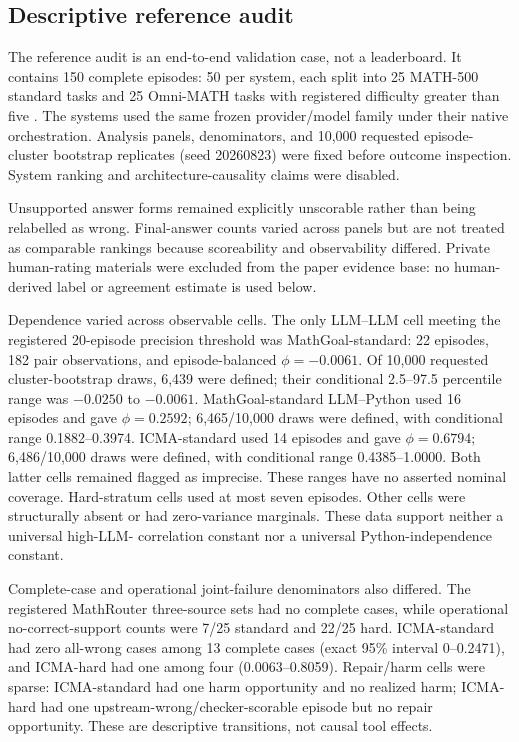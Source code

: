 \documentclass[preprint,12pt,a4paper]{elsarticle}
\begin{document}
\subsection{Descriptive reference audit}

The reference audit is an end-to-end validation case, not a leaderboard. It
contains 150 complete episodes: 50 per system, each split into 25 MATH-500
standard tasks and 25 Omni-MATH tasks with registered difficulty greater than
five \cite{hendrycks2021math,gao2024omnimath}. The systems used the same frozen
provider/model family under their native orchestration. Analysis panels,
denominators, and 10,000 requested
episode-cluster bootstrap replicates (seed 20260823) were fixed before outcome
inspection. System ranking and architecture-causality claims were disabled.

Unsupported answer forms remained explicitly unscorable rather than being
relabelled as wrong. Final-answer counts varied across panels but are not
treated as comparable rankings because scoreability and observability differed.
Private human-rating materials were excluded from the paper evidence base: no
human-derived label or agreement estimate is used below.

Dependence varied across observable cells. The only LLM--LLM cell meeting the
registered 20-episode precision threshold was MathGoal-standard: 22 episodes,
182 pair observations, and episode-balanced $\phi=-0.0061$. Of 10,000 requested
cluster-bootstrap draws, 6,439 were defined; their conditional 2.5--97.5
percentile range was $-0.0250$ to $-0.0061$. MathGoal-standard LLM--Python used
16 episodes and gave $\phi=0.2592$; 6,465/10,000 draws were defined, with
conditional range 0.1882--0.3974. ICMA-standard used 14 episodes and gave
$\phi=0.6794$; 6,486/10,000 draws were defined, with conditional range
0.4385--1.0000. Both latter cells remained flagged as imprecise. These ranges
have no asserted nominal coverage. Hard-stratum
cells used at most seven episodes. Other cells were structurally absent or had
zero-variance marginals. These data support neither a universal high-LLM-
correlation constant nor a universal Python-independence constant.

Complete-case and operational joint-failure denominators also differed. The
registered MathRouter three-source sets had no complete cases, while operational
no-correct-support counts were 7/25 standard and 22/25 hard. ICMA-standard had
zero all-wrong cases among 13 complete cases (exact 95\% interval 0--0.2471),
and ICMA-hard had one among four (0.0063--0.8059). Repair/harm cells were sparse:
ICMA-standard had one harm opportunity and no realized harm; ICMA-hard had one
upstream-wrong/checker-scorable episode but no repair opportunity. These are
descriptive transitions, not causal tool effects.
\end{document}
